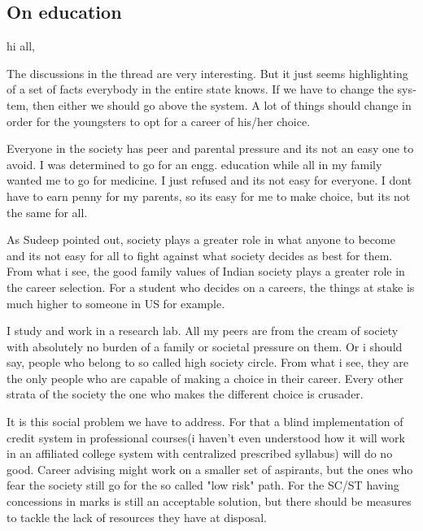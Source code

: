 \newpage
\begin{english}

\subsection*{On education}


hi all,

The discussions in the thread are very interesting. But it just seems highlighting of a set of facts everybody in the entire state knows. If we have to change the system, then either we should go above the system. A lot of things should change in order for the youngsters to opt for a career of his/her choice.

Everyone in the society has peer and parental pressure and its not an easy one to avoid. I was determined to go for an engg. education while all in my family wanted me to go for medicine. I just refused and its not easy for everyone. I dont have to earn penny for my parents, so its easy for me to make choice, but its not the same for all.

As Sudeep pointed out, society plays a greater role in what anyone to become and its not easy for all to fight against what society decides as best for them. From what i see, the good family values of Indian society plays a greater role in the career selection. For a student who decides on a careers, the things at stake is much higher to someone in US for example. 

I study and work in a research lab. All my peers are from the cream of society with absolutely no burden of a family or societal pressure on them. Or i should say, people who belong to so called high society circle. From what i see, they are the only people who are capable of making a choice in their career. Every other strata of the society the one who makes the different choice is crusader.

It is this social problem we have to address. For that a blind implementation of credit system in professional courses(i haven't even understood how it will work in an affiliated college system with centralized prescribed syllabus) will do no good. Career advising might work on a smaller set of aspirants, but the ones who fear the society still go for the so called "low risk" path. For the SC/ST having concessions in marks is still an acceptable solution, but there should be measures to tackle the lack of resources they have at disposal.


\end{english}
